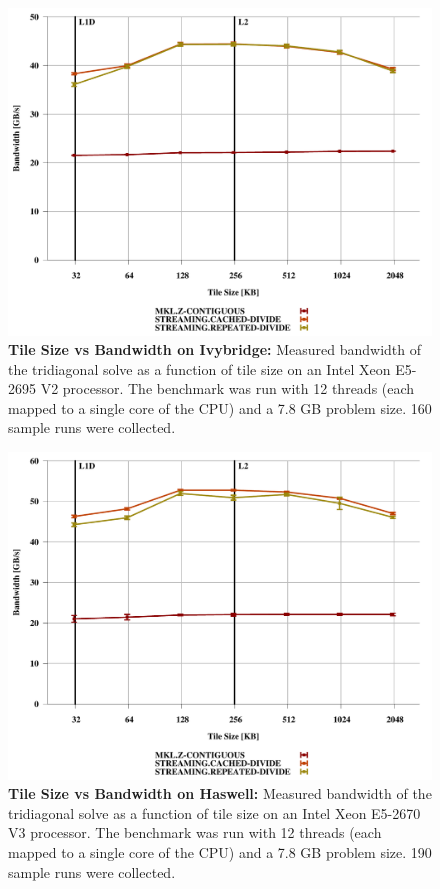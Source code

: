 \documentclass[conference]{IEEEtran}
\begin{document}
\begin{figure}%
\centering
\includegraphics[width=0.9\columnwidth]{figures/post_tsb_tw_sweep_full_matrix_double_precision_production_ivb_e5_2695_v2_08_21_2016_12pus.pdf}
\caption{\textbf{Tile Size vs Bandwidth on Ivybridge:}
Measured bandwidth of the tridiagonal solve as a function of tile size on
an Intel Xeon E5-2695 V2 processor. The benchmark was run with 12 threads (each
mapped to a single core of the CPU) and a 7.8 GB problem size. 160 sample runs
were collected.}
\end{figure}

\begin{figure}%
\centering
\includegraphics[width=0.9\columnwidth]{figures/post_tsb_tw_sweep_full_matrix_double_precision_production_hsw_e5_2670_v3_08_21_2016_12pus.pdf}
\caption{\textbf{Tile Size vs Bandwidth on Haswell:}
Measured bandwidth of the tridiagonal solve as a function of tile size on
an Intel Xeon E5-2670 V3 processor. The benchmark was run with 12 threads (each
mapped to a single core of the CPU) and a 7.8 GB problem size. 190 sample runs
were collected.}
\end{figure}
\end{document}

